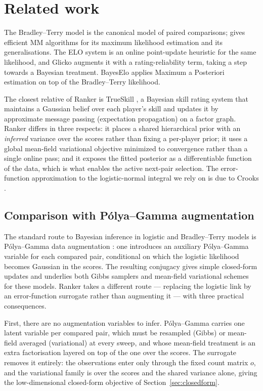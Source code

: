\documentclass[12pt]{article}
\begin{document}
\section{Related work}
    The Bradley--Terry model \cite{bradley1952rank} is the canonical model of paired
    comparisons; \cite{10.1214/aos/1079120141} gives efficient MM algorithms for its maximum
    likelihood estimation and its generalisations. The ELO system \cite{elo1978rating} is an
    online point-update heuristic for the same likelihood, and Glicko \cite{glickman1999glicko}
    augments it with a rating-reliability term, taking a step towards a Bayesian treatment.
    BayesElo applies Maximum a Posteriori estimation on top of the Bradley--Terry likelihood.

    The closest relative of Ranker is TrueSkill \cite{herbrich2007trueskill}, a Bayesian skill
    rating system that maintains a Gaussian belief over each player's skill and updates it by
    approximate message passing (expectation propagation) on a factor graph. Ranker differs in
    three respects: it places a shared hierarchical prior with an \emph{inferred} variance over
    the scores rather than fixing a per-player prior; it uses a global mean-field variational
    objective minimized to convergence rather than a single online pass; and it exposes the
    fitted posterior as a differentiable function of the data, which is what enables the
    active next-pair selection. The error-function approximation to the logistic-normal
    integral we rely on is due to Crooks \cite{crooks2009logistic}.

\subsection{Comparison with P\'olya--Gamma augmentation}
    The standard route to Bayesian inference in logistic and Bradley--Terry models is
    P\'olya--Gamma data augmentation \cite{polson2013bayesian}: one introduces an auxiliary
    P\'olya--Gamma variable for each compared pair, conditional on which the logistic likelihood
    becomes Gaussian in the scores. The resulting conjugacy gives simple closed-form updates and
    underlies both Gibbs samplers and mean-field variational schemes for these models. Ranker takes
    a different route --- replacing the logistic link by an error-function surrogate rather than
    augmenting it --- with three practical consequences.

    First, there are no augmentation variables to infer. P\'olya--Gamma carries one latent variable
    per compared pair, which must be resampled (Gibbs) or mean-field averaged (variational) at every
    sweep, and whose mean-field treatment is an extra factorisation layered on top of the one over
    the scores. The surrogate removes it entirely: the observations enter only through the fixed
    count matrix $o$, and the variational family is over the scores and the shared variance alone,
    giving the low-dimensional closed-form objective of Section~\ref{sec:closedform}.
\end{document}
